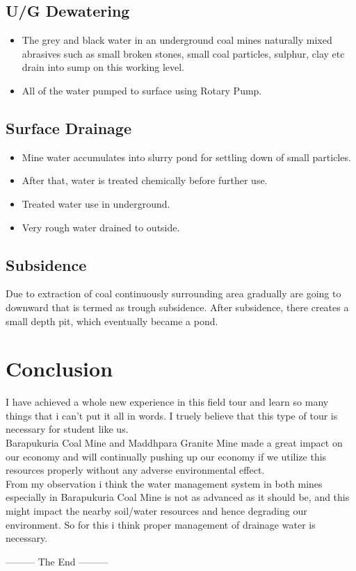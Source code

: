 \documentclass[12pt,a4paper]{article}
\begin{document}
\subsection{U/G Dewatering}
\begin{itemize}
\item The grey and black water in an underground coal mines naturally mixed abrasives such as small broken stones, small coal particles, sulphur, clay etc drain into sump on this working level.
\item All of the water pumped to surface using Rotary Pump.
\end{itemize}

\subsection{Surface Drainage}
\begin{itemize}
\item Mine water accumulates into slurry pond for settling down of small particles.
\item After that, water is treated chemically before further use.
\item Treated water use in underground.
\item Very rough water drained to outside.
\end{itemize}

\subsection{Subsidence}
Due to extraction of coal continuously surrounding area gradually are going to downward that is termed as trough subsidence. After subsidence, there creates a small depth pit, which eventually became a pond.



\section{Conclusion}
I have achieved a whole new experience in this field tour and learn so many things that i can't put it all in words. I truely believe that this type of tour is necessary for student like us.\\

\noindent
Barapukuria Coal Mine and Maddhpara Granite Mine made a great impact on our economy and will continually pushing up our economy if we utilize this resources properly without any adverse environmental effect.\\
From my observation i think the water management system in both mines especially  in Barapukuria Coal Mine is not as advanced as it should be, and this might impact the nearby soil/water resources and hence degrading our environment. So for this i think proper management of drainage water is necessary.



\vspace{40pt}
\begin{center}
\large{--------- The End ---------}
\end{center}
\end{document}
